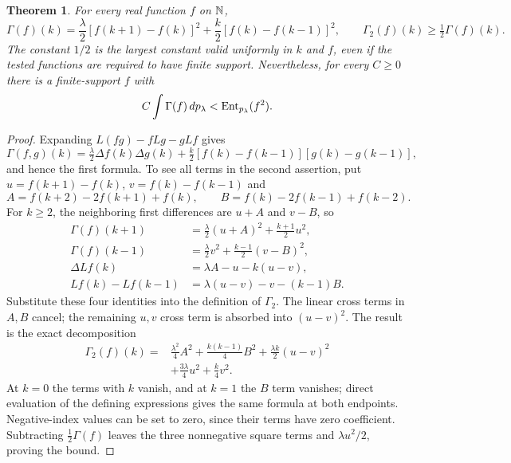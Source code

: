 \documentclass[11pt]{article}
\newtheorem{theorem}{Theorem}[section]
\begin{document}
\begin{theorem}\label{thm:jumpcurvature}
For every real function $f$ on $\mathbb N$,
\begin{equation}\label{eq:jumpGamma}
 \Gamma(f)(k)=\frac\lambda2[f(k+1)-f(k)]^2
       +\frac k2[f(k)-f(k-1)]^2,
 \qquad \Gamma_2(f)(k)\geq\tfrac12\Gamma(f)(k).
\end{equation}
The constant $1/2$ is the largest constant valid uniformly in $k$ and
$f$, even if the tested functions are required to have finite support.
Nevertheless, for every $C\geq0$ there is a finite-support $f$ with
\begin{equation}\label{eq:curvatureentropyfailure}
 C\int\Gamma(f)\,dp_\lambda<\operatorname{Ent}_{p_\lambda}(f^2).
\end{equation}
\end{theorem}
\begin{proof}
Expanding $L(fg)-fLg-gLf$ gives
\[
 \Gamma(f,g)(k)=\tfrac\lambda2\Delta f(k)\Delta g(k)
 +\tfrac k2[f(k)-f(k-1)][g(k)-g(k-1)],
\]
and hence the first formula. To see all terms in the second assertion,
put $u=f(k+1)-f(k)$, $v=f(k)-f(k-1)$ and
\[
 A=f(k+2)-2f(k+1)+f(k),\qquad
 B=f(k)-2f(k-1)+f(k-2).
\]
For $k\geq2$, the neighboring first differences are $u+A$ and $v-B$,
so
\begin{align*}
 \Gamma(f)(k+1)&=\tfrac\lambda2(u+A)^2+\tfrac{k+1}2u^2,\\
 \Gamma(f)(k-1)&=\tfrac\lambda2v^2+\tfrac{k-1}2(v-B)^2,\\
 \Delta Lf(k)&=\lambda A-u-k(u-v),\\
 Lf(k)-Lf(k-1)&=\lambda(u-v)-v-(k-1)B.
\end{align*}
Substitute these four identities into the definition of $\Gamma_2$.
The linear cross terms in $A,B$ cancel; the remaining $u,v$ cross
term is absorbed into $(u-v)^2$. The result is the exact decomposition
\begin{equation}\label{eq:jumpGamma2}
 \begin{split}
 \Gamma_2(f)(k)={}&\frac{\lambda^2}4 A^2+
       \frac{k(k-1)}4 B^2+\frac{\lambda k}2(u-v)^2\\
       &+\frac{3\lambda}4u^2+\frac k4v^2.
 \end{split}
\end{equation}
At $k=0$ the terms with $k$ vanish, and at $k=1$ the $B$ term
vanishes; direct evaluation of the defining expressions gives the same
formula at both endpoints. Negative-index values can be set to zero,
since their terms have zero coefficient. Subtracting
$\tfrac12\Gamma(f)$ leaves the three nonnegative square terms and
$\lambda u^2/2$, proving the bound.


\end{proof}
\end{document}
